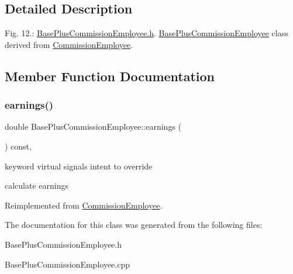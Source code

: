 \subsection{Detailed Description}
Fig. 12.\+: \mbox{\hyperlink{_base_plus_commission_employee_8h_source}{Base\+Plus\+Commission\+Employee.\+h}}. \mbox{\hyperlink{class_base_plus_commission_employee}{Base\+Plus\+Commission\+Employee}} class derived from \mbox{\hyperlink{class_commission_employee}{Commission\+Employee}}. 

\subsection{Member Function Documentation}
\mbox{\label{class_base_plus_commission_employee_a79cefc4722f05de0e545c2f911e2dcab}} 
\subsubsection{\texorpdfstring{earnings()}{earnings()}}
{\footnotesize\ttfamily double Base\+Plus\+Commission\+Employee\+::earnings (\begin{DoxyParamCaption}{ }\end{DoxyParamCaption}) const\hspace{0.3cm}{\ttfamily [override]}, {\ttfamily [virtual]}}



keyword virtual signals intent to override 

calculate earnings 

Reimplemented from \mbox{\hyperlink{class_commission_employee_aa7759d5908bd7357a9976c2c2740e9bb}{Commission\+Employee}}.



The documentation for this class was generated from the following files\+:\begin{DoxyCompactItemize}
\item 
Base\+Plus\+Commission\+Employee.\+h\item 
Base\+Plus\+Commission\+Employee.\+cpp\end{DoxyCompactItemize}
